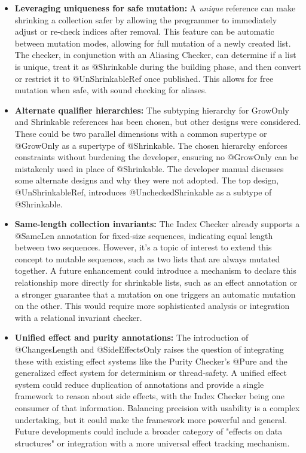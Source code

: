     \begin{itemize}
    \item
      \textbf{Leveraging uniqueness for safe mutation:}
        A \emph{unique} reference can make shrinking a collection safer by allowing the programmer
        to immediately adjust or re-check indices after removal. This feature can be automatic
        between mutation modes, allowing for full mutation of a newly created list. The checker,
        in conjunction with an Aliasing Checker, can determine if a list is unique, treat it as
        @Shrinkable during the building phase, and then convert or restrict it to @UnShrinkableRef
        once published. This allows for free mutation when safe, with sound checking for aliases.

    \item
      \textbf{Alternate qualifier hierarchies:}
        The subtyping hierarchy for GrowOnly and Shrinkable references has been chosen, but other
        designs were considered. These could be two parallel dimensions with a common supertype or
        @GrowOnly as a supertype of @Shrinkable. The chosen hierarchy enforces constraints without
        burdening the developer, ensuring no @GrowOnly can be mistakenly used in place of @Shrinkable.
        The developer manual discusses some alternate designs and why they were not adopted.
        The top design, @UnShrinkableRef, introduces @UncheckedShrinkable as a subtype of @Shrinkable.

    \item
      \textbf{Same-length collection invariants:}
        The Index Checker already supports a @SameLen annotation for fixed-size sequences, indicating
        equal length between two sequences. However, it's a topic of interest to extend this concept
        to mutable sequences, such as two lists that are always mutated together. A future enhancement
        could introduce a mechanism to declare this relationship more directly for shrinkable lists,
        such as an effect annotation or a stronger guarantee that a mutation on one triggers an automatic
        mutation on the other. This would require more sophisticated analysis or integration with a
        relational invariant checker.

    \item
      \textbf{Unified effect and purity annotations:}
        The introduction of @ChangesLength and @SideEffectsOnly raises the question of integrating these
        with existing effect systems like the Purity Checker's @Pure and the generalized effect system
        for determinism or thread-safety. A unified effect system could reduce duplication of annotations
        and provide a single framework to reason about side effects, with the Index Checker being one
        consumer of that information. Balancing precision with usability is a complex undertaking, but it
        could make the framework more powerful and general. Future developments could include a broader
        category of "effects on data structures" or integration with a more universal effect tracking mechanism.


\end{itemize}
